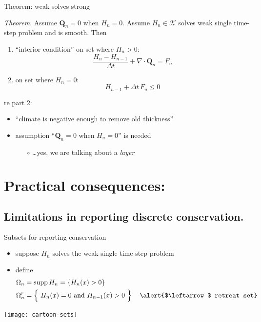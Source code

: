 \documentclass{beamer}
\newcommand\bQ{\mathbf{Q}}
\newcommand{\Div}{\nabla\cdot}
\begin{document}
\begin{frame}{Theorem: weak solves strong}

\emph{Theorem}.  Assume $\bQ_n=0$ when $H_n=0$.  Assume $H_n \in \mathcal{K}$ solves weak single time-step problem and is smooth.  Then
  \begin{enumerate}
  \item ``interior condition'' on set where $H_n>0$:
    $$\frac{H_n - H_{n-1}}{\Delta t} + \Div \bQ_n = F_n$$
  \item on set where $H_n = 0$:
    $$H_{n-1} + \Delta t\, F_n \le 0$$
  \end{enumerate}

\bigskip
re part 2:
  \begin{itemize}
  \item ``climate is negative enough to remove old thickness''
  \item assumption ``$\bQ_n=0$ when $H_n=0$'' is needed
    \begin{itemize}
    \item[$\circ$] \dots yes, we are talking about a \emph{layer}
    \end{itemize}
  \end{itemize}
\end{frame}


\section{Practical consequences:}

\subsection{Limitations in reporting discrete conservation.}

\begin{frame}{Subsets for reporting conservation}
\begin{itemize}
\item suppose $H_n$ solves the weak single time-step problem
\item define
	\begin{align*}
	\Omega_n &= \operatorname{supp} H_n = \left\{H_n(x) > 0\right\} \\
	\Omega_n^r &= \left\{\phantom{\Big|}H_n(x)= 0 \text{ and } H_{n-1}(x) > 0\phantom{\Big|}\right\} \quad \text{\alert{$\leftarrow$ retreat set}}
	\end{align*}
\end{itemize}

\vspace{-2mm}
\begin{center}
\texttt{[image: cartoon-sets]}
\end{center}
\end{frame}
\end{document}
